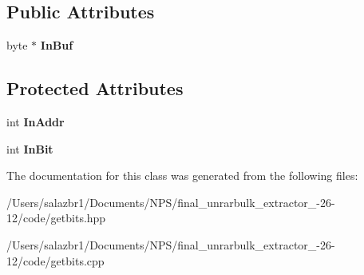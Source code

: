 \subsection*{Public Attributes}
\begin{DoxyCompactItemize}
\item 
\hypertarget{class_bit_input_af86e47d05a107bcd633e19870ff4b18c}{byte $\ast$ {\bfseries In\-Buf}}\label{class_bit_input_af86e47d05a107bcd633e19870ff4b18c}

\end{DoxyCompactItemize}
\subsection*{Protected Attributes}
\begin{DoxyCompactItemize}
\item 
\hypertarget{class_bit_input_ae497d2964eaf24014487514ee8b67bb1}{int {\bfseries In\-Addr}}\label{class_bit_input_ae497d2964eaf24014487514ee8b67bb1}

\item 
\hypertarget{class_bit_input_a5644c81728aa364fda230975bf73f371}{int {\bfseries In\-Bit}}\label{class_bit_input_a5644c81728aa364fda230975bf73f371}

\end{DoxyCompactItemize}


The documentation for this class was generated from the following files\-:\begin{DoxyCompactItemize}
\item 
/\-Users/salazbr1/\-Documents/\-N\-P\-S/final\-\_\-unrarbulk\-\_\-extractor\-\_-\/26-\/12/code/getbits.\-hpp\item 
/\-Users/salazbr1/\-Documents/\-N\-P\-S/final\-\_\-unrarbulk\-\_\-extractor\-\_-\/26-\/12/code/getbits.\-cpp\end{DoxyCompactItemize}
